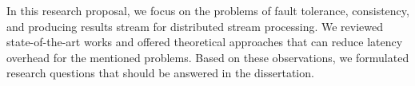 In this research proposal, we focus on the problems of fault tolerance, consistency, and producing results stream for distributed stream processing. We reviewed state-of-the-art works and offered theoretical approaches that can reduce latency overhead for the mentioned problems. Based on these observations, we formulated research questions that should be answered in the dissertation.